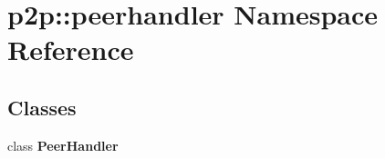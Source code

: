 \section{p2p::peerhandler Namespace Reference}
\label{namespacep2p_1_1peerhandler}


\subsection*{Classes}
\begin{CompactItemize}
\item 
class {\bf PeerHandler}
\end{CompactItemize}

